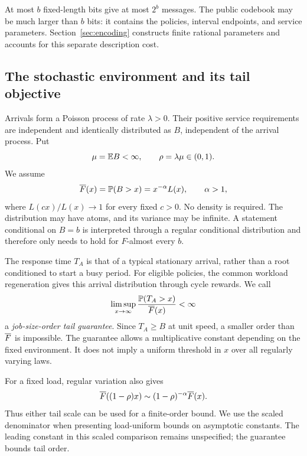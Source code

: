 At most $b$ fixed-length bits give at most $2^b$ messages. The public codebook may be much larger than $b$ bits: it contains the policies, interval endpoints, and service parameters. Section~\ref{sec:encoding} constructs finite rational parameters and accounts for this separate description cost.

\subsection{The stochastic environment and its tail objective}
Arrivals form a Poisson process of rate $\lambda>0$. Their positive service requirements are independent and identically distributed as $B$, independent of the arrival process. Put
\begin{equation}\label{eq:load}
 \mu=\mathbb E B<\infty,\qquad \rho=\lambda\mu\in(0,1).
\end{equation}
We assume
\begin{equation}\label{eq:rv}
 \overline F(x)=\mathbb P(B>x)=x^{-\alpha}L(x),\qquad \alpha>1,
\end{equation}
where $L(cx)/L(x)\to1$ for every fixed $c>0$. No density is required. The distribution may have atoms, and its variance may be infinite. A statement conditional on $B=b$ is interpreted through a regular conditional distribution and therefore only needs to hold for $F$-almost every $b$.

The response time $T_A$ is that of a typical stationary arrival, rather than a root conditioned to start a busy period. For eligible policies, the common workload regeneration gives this arrival distribution through cycle rewards. We call
\begin{equation}\label{eq:tail-order}
 \limsup_{x\to\infty}\frac{\mathbb P(T_A>x)}{\overline F(x)}<\infty
\end{equation}
a \emph{job-size-order tail guarantee}. Since $T_A\geq B$ at unit speed, a smaller order than $\overline F$ is impossible. The guarantee allows a multiplicative constant depending on the fixed environment. It does not imply a uniform threshold in $x$ over all regularly varying laws.

For a fixed load, regular variation also gives
\begin{equation}\label{eq:scale-equivalence}
 \overline F((1-\rho)x)\sim(1-\rho)^{-\alpha}\overline F(x).
\end{equation}
Thus either tail scale can be used for a finite-order bound. We use the scaled denominator when presenting load-uniform bounds on asymptotic constants. The leading constant in this scaled comparison remains unspecified; the guarantee bounds tail order.

